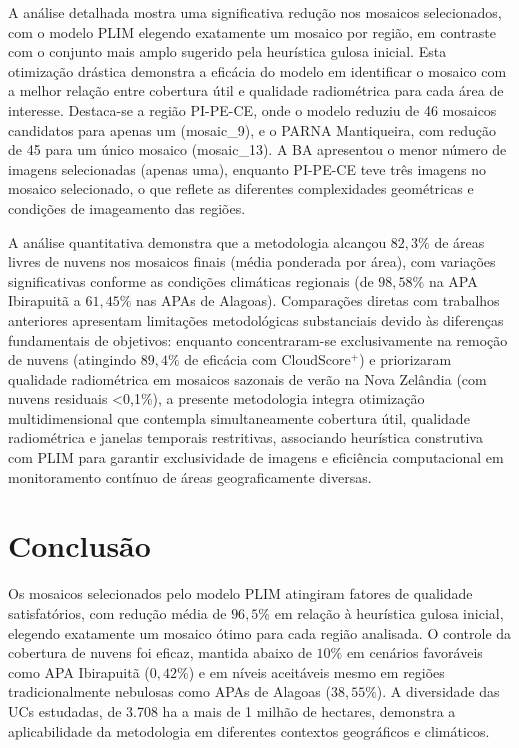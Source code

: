 \documentclass[a4paper,11pt]{article}
\begin{document}
A análise detalhada mostra uma significativa redução nos mosaicos selecionados, com o modelo PLIM elegendo exatamente um mosaico por região, em contraste com o conjunto mais amplo sugerido pela heurística gulosa inicial. Esta otimização drástica demonstra a eficácia do modelo em identificar o mosaico com a melhor relação entre cobertura útil e qualidade radiométrica para cada área de interesse. Destaca-se a região PI-PE-CE, onde o modelo reduziu de 46 mosaicos candidatos para apenas um (mosaic\_9), e o PARNA Mantiqueira, com redução de 45 para um único mosaico (mosaic\_13). A BA apresentou o menor número de imagens selecionadas (apenas uma), enquanto PI-PE-CE teve três imagens no mosaico selecionado, o que reflete as diferentes complexidades geométricas e condições de imageamento das regiões.

A análise quantitativa demonstra que a metodologia alcançou $82,3\%$ de áreas livres de nuvens nos mosaicos finais (média ponderada por área), com variações significativas conforme as condições climáticas regionais (de $98,58\%$ na APA Ibirapuitã a $61,45\%$ nas APAs de Alagoas). Comparações diretas com trabalhos anteriores apresentam limitações metodológicas substanciais devido às diferenças fundamentais de objetivos: enquanto \citet{rodriguez-puerta:2024} concentraram-se exclusivamente na remoção de nuvens (atingindo $89,4\%$ de eficácia com CloudScore$^{+}$) e \citet{shepherd2020automated} priorizaram qualidade radiométrica em mosaicos sazonais de verão na Nova Zelândia (com nuvens residuais <0,1\%), a presente metodologia integra otimização multidimensional que contempla simultaneamente cobertura útil, qualidade radiométrica e janelas temporais restritivas, associando heurística construtiva com PLIM para garantir exclusividade de imagens e eficiência computacional em monitoramento contínuo de áreas geograficamente diversas.

\vspace{-8mm}
\section{Conclusão}
\vspace{-4mm}
Os mosaicos selecionados pelo modelo PLIM atingiram fatores de qualidade satisfatórios, com redução média de $96,5\%$ em relação à heurística gulosa inicial, elegendo exatamente um mosaico ótimo para cada região analisada. O controle da cobertura de nuvens foi eficaz, mantida abaixo de $10\%$ em cenários favoráveis como APA Ibirapuitã ($0,42\%$) e em níveis aceitáveis mesmo em regiões tradicionalmente nebulosas como APAs de Alagoas ($38,55\%$). A diversidade das UCs estudadas, de 3.708 ha a mais de 1 milhão de hectares, demonstra a aplicabilidade da metodologia em diferentes contextos geográficos e climáticos.
\end{document}
